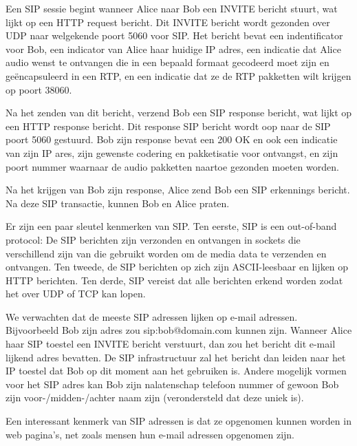 
\noindent Een SIP sessie begint wanneer Alice naar Bob een INVITE bericht stuurt, wat lijkt op een HTTP request bericht. Dit INVITE bericht wordt gezonden over UDP naar welgekende poort 5060 voor SIP. Het bericht bevat een indentificator voor Bob, een indicator van Alice haar huidige IP adres, een indicatie dat Alice audio wenst te ontvangen die in een bepaald formaat gecodeerd moet zijn en geëncapsuleerd in een RTP, en een indicatie dat ze de RTP pakketten wilt krijgen op poort 38060. 

\noindent Na het zenden van dit bericht, verzend Bob een SIP response bericht, wat lijkt op een HTTP response bericht. Dit response SIP bericht wordt oop naar de SIP poort 5060 gestuurd. Bob zijn response bevat een 200 OK en ook een indicatie van zijn IP ares, zijn gewenste codering en pakketisatie voor ontvangst, en zijn poort nummer waarnaar de audio pakketten naartoe gezonden moeten worden.

\noindent Na het krijgen van Bob zijn response, Alice zend Bob een SIP erkennings bericht. Na deze SIP transactie, kunnen Bob en Alice praten.

\noindent Er zijn een paar sleutel kenmerken van SIP. Ten eerste, SIP is een out-of-band protocol: De SIP berichten zijn verzonden en ontvangen in sockets die verschillend zijn van die gebruikt worden om de media data te verzenden en ontvangen. Ten tweede, de SIP berichten op zich zijn ASCII-leesbaar en lijken op HTTP berichten. Ten derde, SIP vereist dat alle berichten erkend worden zodat het over UDP of TCP kan lopen.


\noindent We verwachten dat de meeste SIP adressen lijken op e-mail adressen. Bijvoorbeeld Bob zijn adres zou sip:bob@domain.com kunnen zijn. Wanneer Alice haar SIP toestel een INVITE bericht verstuurt, dan zou het bericht dit e-mail lijkend adres bevatten. De SIP infrastructuur zal het bericht dan leiden naar het IP toestel dat Bob op dit moment aan het gebruiken is. Andere mogelijk vormen voor het SIP adres kan Bob zijn nalatenschap telefoon nummer of gewoon Bob zijn voor-/midden-/achter naam zijn (verondersteld dat deze uniek is).

\noindent Een interessant kenmerk van SIP adressen is dat ze opgenomen kunnen worden in web pagina’s, net zoals mensen hun e-mail adressen opgenomen zijn.



